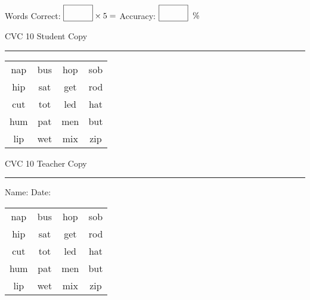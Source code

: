 \documentclass{memoir}
\begin{document}
\normalsize

Words Correct: $\fbox{\phantom{\huge 100}} \times 5 = $ Accuracy: $\fbox{\phantom{\huge 100}}\;\; \%$ 

\vfill

\newpage


\footnotesize \noindent
CVC 10 \hfill Student Copy
\smallskip
\hrule

\huge

\setlength{\tabcolsep}{14pt}
\def\arraystretch{2}

{\selectfont


\begin{vplace}[0.5]
\begin{center}
\begin{tabular}{cccc}
nap & bus & hop & sob \\
hip & sat & get & rod \\
cut & tot & led & hat \\
hum & pat & men & but \\
lip & wet & mix & zip \\
\end{tabular}
\end{center}
\end{vplace}

}

\newpage

\footnotesize \noindent
CVC 10 \hfill Teacher Copy
\smallskip
\hrule

\normalsize

\vfill

\noindent
Name: \underline{\hspace{1.75in}} \hfill Date: \underline{\hspace{1in}}

\huge

{\selectfont


\begin{vplace}[0.5]
\begin{center}
\begin{tabular}{cccc}
nap & bus & hop & sob \\
hip & sat & get & rod \\
cut & tot & led & hat \\
hum & pat & men & but \\
lip & wet & mix & zip \\
\end{tabular}
\end{center}
\end{vplace}



}
\end{document}
